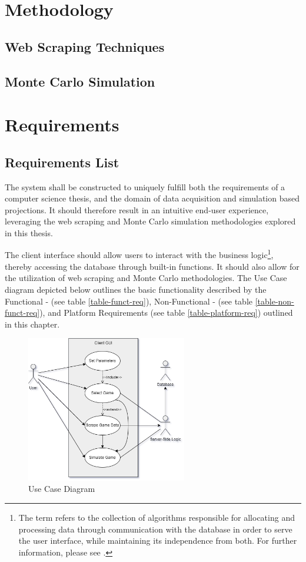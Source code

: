 \documentclass{thesis-ekf}
\theoremstyle{definition}
\theoremstyle{remark}
\begin{document}
\chapter{Methodology}
\section{Web Scraping Techniques}
\section{Monte Carlo Simulation}




\chapter{Requirements}

\section{Requirements List}
The system shall be constructed to uniquely fulfill both the requirements of a computer science thesis, and the domain of data acquisition and simulation based projections. It should therefore result in an intuitive end-user experience, leveraging the web scraping and Monte Carlo simulation methodologies explored in this thesis.

The client interface should allow users to interact with the business logic\footnote{The term refers to the collection of algorithms responsible for allocating and processing data through communication with the database in order to serve the user interface, while maintaining its independence from both. For further information, please see \cite{Booch}.}, thereby accessing the database through built-in functions. It should also allow for the utilization of web scraping and Monte Carlo methodologies. The Use Case diagram depicted below outlines the basic functionality described by the Functional - (see table {\ref{table-funct-req}}), Non-Functional - (see table {\ref{table-non-funct-req}}), and Platform Requirements (see table {\ref{table-platform-req}}) outlined in this chapter.

\begin{figure}[th!]
	\centering
	\includegraphics[width=7cm]{img/usecase}
	\caption{Use Case Diagram}
	\label{img-usecase}
\end{figure}
\end{document}
